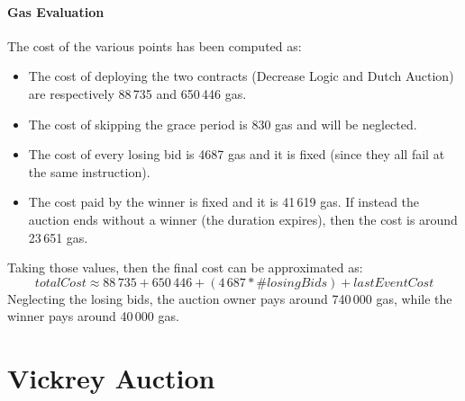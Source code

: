 \documentclass[11pt, a4paper]{report}
\begin{document}
		\paragraph*{Gas Evaluation}
		The cost of the various points has been computed as: 
		\begin{itemize}
			\item The cost of deploying the two contracts (Decrease Logic and Dutch Auction) are respectively 88\,735 and 650\,446 gas. 
			\item The cost of skipping the grace period is 830 gas and will be neglected.
			\item The cost of every losing bid is 4687 gas and it is fixed (since they all fail at the same instruction). 
			\item The cost paid by the winner is fixed and it is 41\,619 gas. If instead the auction ends without a winner (the duration expires), then the cost is around 23\,651 gas.
		\end{itemize}
		Taking those values, then the final cost can be approximated as: $$totalCost \approx 88\,735 + 650\,446 + (4\,687 * \#losingBids) + lastEventCost $$
		Neglecting the losing bids, the auction owner pays around 740\,000 gas, while the winner pays around 40\,000 gas.
			

\section*{Vickrey Auction}
\label{sec:vickreyAuction}
\end{document}
